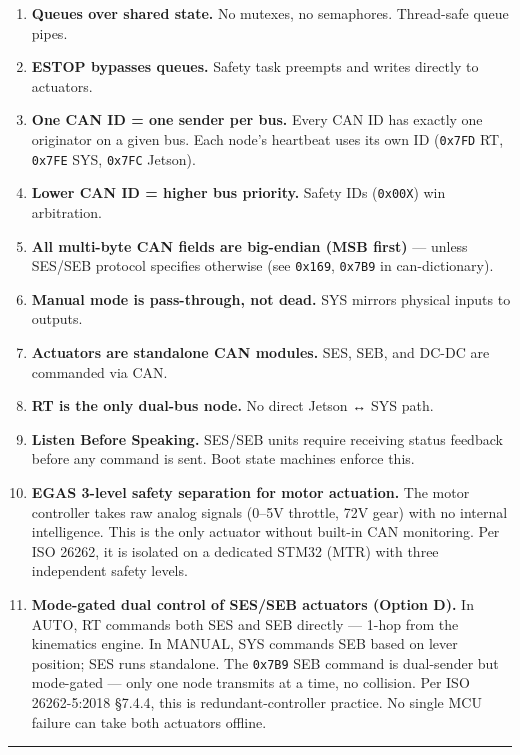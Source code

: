 \begin{enumerate}
\def\labelenumi{\arabic{enumi}.}
\tightlist
\item
  \textbf{Queues over shared state.} No mutexes, no semaphores. Thread-safe
  queue pipes.
\item
  \textbf{ESTOP bypasses queues.} Safety task preempts and writes directly to
  actuators.
\item
  \textbf{One CAN ID = one sender per bus.} Every CAN ID has exactly one
  originator on a given bus. Each node's heartbeat uses its own ID
  (\texttt{0x7FD} RT, \texttt{0x7FE} SYS, \texttt{0x7FC} Jetson).
\item
  \textbf{Lower CAN ID = higher bus priority.} Safety IDs (\texttt{0x00X}) win
  arbitration.
\item
  \textbf{All multi-byte CAN fields are big-endian (MSB first)} --- unless
  SES/SEB protocol specifies otherwise (see \texttt{0x169}, \texttt{0x7B9} in
  can-dictionary).
\item
  \textbf{Manual mode is pass-through, not dead.} SYS mirrors physical inputs to
  outputs.
\item
  \textbf{Actuators are standalone CAN modules.} SES, SEB, and DC-DC are
  commanded via CAN.
\item
  \textbf{RT is the only dual-bus node.} No direct Jetson ↔ SYS path.
\item
  \textbf{Listen Before Speaking.} SES/SEB units require receiving status
  feedback before any command is sent. Boot state machines enforce this.
\item
  \textbf{EGAS 3-level safety separation for motor actuation.} The motor
  controller takes raw analog signals (0--5V throttle, 72V gear) with no
  internal intelligence. This is the only actuator without built-in CAN
  monitoring. Per ISO 26262, it is isolated on a dedicated STM32 (MTR) with
  three independent safety levels.
\item
  \textbf{Mode-gated dual control of SES/SEB actuators (Option D).} In AUTO, RT
  commands both SES and SEB directly --- 1-hop from the kinematics engine. In
  MANUAL, SYS commands SEB based on lever position; SES runs standalone. The
  \texttt{0x7B9} SEB command is dual-sender but mode-gated --- only one node
  transmits at a time, no collision. Per ISO 26262-5:2018 §7.4.4, this is
  redundant-controller practice. No single MCU failure can take both actuators
  offline.
\end{enumerate}

\begin{center}\rule{0.5\linewidth}{0.5pt}\end{center}

